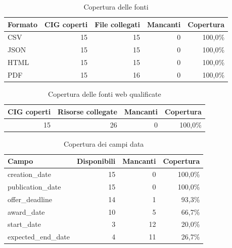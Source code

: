 \begin{table}[htbp]
\centering
\caption{Copertura delle fonti}
\begin{tabular}{lrrrr}
\toprule
Formato & CIG coperti & File collegati & Mancanti & Copertura \\
\midrule
CSV & 15 & 15 & 0 & 100,0\% \\
JSON & 15 & 15 & 0 & 100,0\% \\
HTML & 15 & 15 & 0 & 100,0\% \\
PDF & 15 & 16 & 0 & 100,0\% \\
\bottomrule
\end{tabular}
\end{table}

\begin{table}[htbp]
\centering
\caption{Copertura delle fonti web qualificate}
\begin{tabular}{rrrr}
\toprule
CIG coperti & Risorse collegate & Mancanti & Copertura \\
\midrule
15 & 26 & 0 & 100,0\% \\
\bottomrule
\end{tabular}
\end{table}

\begin{table}[htbp]
\centering
\small
\caption{Copertura dei campi data}
\begin{tabular}{lrrr}
\toprule
Campo & Disponibili & Mancanti & Copertura \\
\midrule
creation\_date & 15 & 0 & 100,0\% \\
publication\_date & 15 & 0 & 100,0\% \\
offer\_deadline & 14 & 1 & 93,3\% \\
award\_date & 10 & 5 & 66,7\% \\
start\_date & 3 & 12 & 20,0\% \\
expected\_end\_date & 4 & 11 & 26,7\% \\
\bottomrule
\end{tabular}
\end{table}
